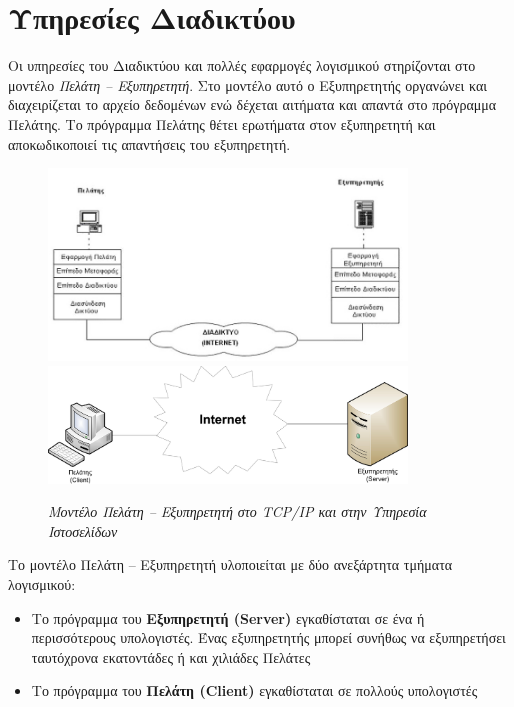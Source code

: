 %
%
\section{Υπηρεσίες Διαδικτύου}

Οι υπηρεσίες του Διαδικτύου και πολλές εφαρμογές λογισμικού στηρίζονται στο μοντέλο \emph{Πελάτη -- Εξυπηρετητή}. Στο μοντέλο αυτό ο Εξυπηρετητής οργανώνει και διαχειρίζεται το αρχείο δεδομένων ενώ δέχεται αιτήματα και απαντά στο πρόγραμμα Πελάτης. Το πρόγραμμα Πελάτης θέτει ερωτήματα στον εξυπηρετητή και αποκωδικοποιεί τις απαντήσεις του εξυπηρετητή. 

 \begin{figure}[!ht]
  \centering
  \includegraphics[width=0.85\textwidth]{images/chapter6/6-5}
  \includegraphics[width=0.85\textwidth]{images/chapter6/6-6}
  \caption {\textsl{Μοντέλο Πελάτη -- Εξυπηρετητή στο TCP/IP και στην Υπηρεσία Ιστοσελίδων }}
  \label{6-5}
\end{figure}

Το μοντέλο Πελάτη -- Εξυπηρετητή υλοποιείται με δύο ανεξάρτητα τμήματα λογισμικού:

\begin{itemize}
\item Το πρόγραμμα του \textbf{Εξυπηρετητή (Server)} εγκαθίσταται σε ένα ή περισσότερους υπολογιστές. Ένας εξυπηρετητής μπορεί συνήθως να εξυπηρετήσει ταυτόχρονα εκατοντάδες ή και χιλιάδες Πελάτες
\item Το πρόγραμμα του \textbf{Πελάτη (Client)} εγκαθίσταται σε πολλούς υπολογιστές
\end{itemize}

